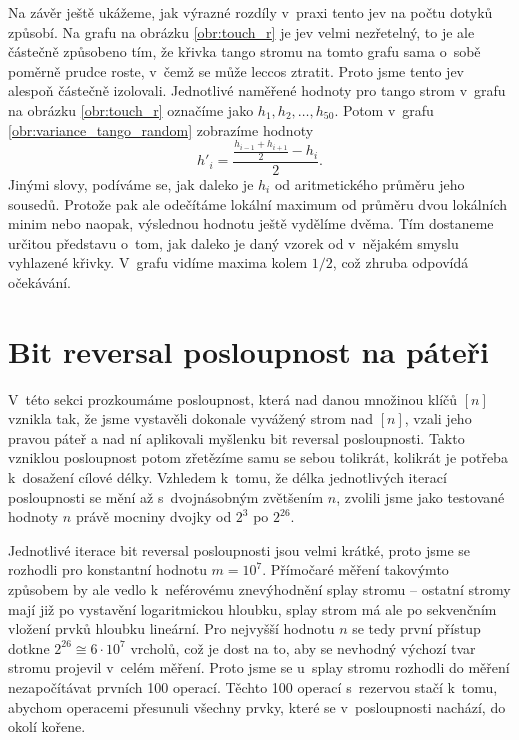 
Na závěr ještě ukážeme, jak výrazné rozdíly v~praxi tento jev na počtu dotyků
způsobí. Na grafu na obrázku \ref{obr:touch_r} je jev velmi nezřetelný, to je ale
částečně způsobeno tím, že křivka tango stromu na tomto grafu sama o~sobě poměrně prudce
roste, v~čemž se může leccos ztratit. Proto jsme tento jev alespoň částečně
izolovali. Jednotlivé naměřené hodnoty pro tango strom v~grafu na obrázku
\ref{obr:touch_r} označíme jako $h_1, h_2, \dots, h_{50}$. Potom v~grafu
\ref{obr:variance_tango_random} zobrazíme hodnoty $$h'_i =
\frac{\frac{h_{i-1}+h_{i+1}}2-h_i}2.$$ Jinými slovy, podíváme se, jak daleko je
$h_i$ od aritmetického průměru jeho sousedů. Protože pak ale odečítáme lokální
maximum od průměru dvou lokálních minim nebo naopak, výslednou hodnotu ještě
vydělíme dvěma. Tím dostaneme určitou představu o~tom, jak daleko je daný
vzorek od v~nějakém smyslu vyhlazené křivky. V~grafu vidíme maxima kolem $1/2$,
což zhruba odpovídá očekávání. 

\section{Bit reversal posloupnost na páteři}

V~této sekci prozkoumáme posloupnost, která nad danou množinou klíčů $[n]$
vznikla tak, že jsme vystavěli dokonale vyvážený strom nad $[n]$, vzali jeho
pravou páteř a nad ní aplikovali myšlenku bit reversal posloupnosti. Takto
vzniklou posloupnost potom zřetězíme samu se sebou tolikrát, kolikrát je potřeba
k~dosažení cílové délky. Vzhledem k~tomu, že délka jednotlivých iterací
posloupnosti se mění až s~dvojnásobným zvětšením $n$, zvolili jsme jako
testované hodnoty $n$ právě mocniny dvojky od $2^3$ po $2^{26}$.

Jednotlivé iterace bit reversal posloupnosti jsou velmi krátké, proto jsme se
rozhodli pro konstantní hodnotu $m=10^7$. Přímočaré měření takovýmto
způsobem by ale vedlo k~neférovému znevýhodnění splay stromu -- ostatní stromy
mají již po vystavění logaritmickou hloubku, splay strom má ale po sekvenčním
vložení prvků hloubku lineární. Pro nejvyšší hodnotu $n$ se tedy první přístup
dotkne $2^{26} \cong 6\cdot10^7$ vrcholů, což je dost na to, aby se nevhodný
výchozí tvar stromu projevil v~celém měření. Proto jsme se u~splay stromu
rozhodli do měření nezapočítávat prvních 100 operací. Těchto 100 operací
s~rezervou stačí k~tomu, abychom operacemi  přesunuli všechny prvky,
které se v~posloupnosti nachází, do okolí kořene.

